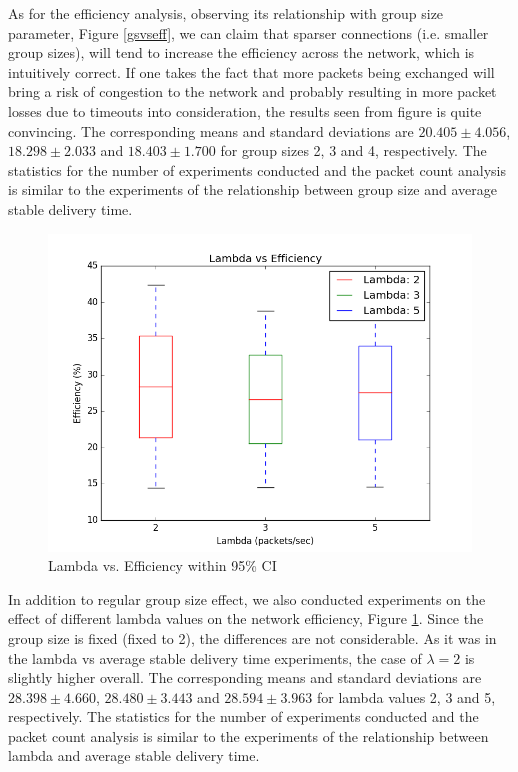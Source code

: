 \documentclass[a4paper, 12pt]{article}
\begin{document}
As for the efficiency analysis, observing its relationship with group size parameter, Figure \ref{gsvseff}, we can claim that sparser connections (i.e. smaller group sizes), will tend to increase the efficiency across the network, which is intuitively correct. If one takes the fact that more packets being exchanged will bring a risk of congestion to the network and probably resulting in more packet losses due to timeouts into consideration, the results seen from figure is quite convincing. The corresponding means and standard deviations are $20.405 \pm 4.056$, $18.298 \pm 2.033$ and $18.403 \pm 1.700$ for group sizes 2, 3 and 4, respectively. The statistics for the number of experiments conducted and the packet count analysis is similar to the experiments of the relationship between group size and average stable delivery time.

\begin{figure}[h]
\centering
   \includegraphics[scale=0.45]{Lambda_vs_Eff_Real.png}
   \caption{Lambda vs. Efficiency within 95\% CI}
   \label{lbvseff}
\end{figure}

In addition to regular group size effect, we also conducted experiments on the effect of different lambda values on the network efficiency, Figure \ref{lbvseff}. Since the group size is fixed (fixed to 2), the differences are not considerable. As it was in the lambda vs average stable delivery time experiments, the case of $\lambda = 2$ is slightly higher overall. The corresponding means and standard deviations are $28.398 \pm 4.660$, $28.480 \pm 3.443$ and $28.594 \pm 3.963$ for lambda values 2, 3 and 5, respectively. The statistics for the number of experiments conducted and the packet count analysis is similar to the experiments of the relationship between lambda and average stable delivery time.
\end{document}
